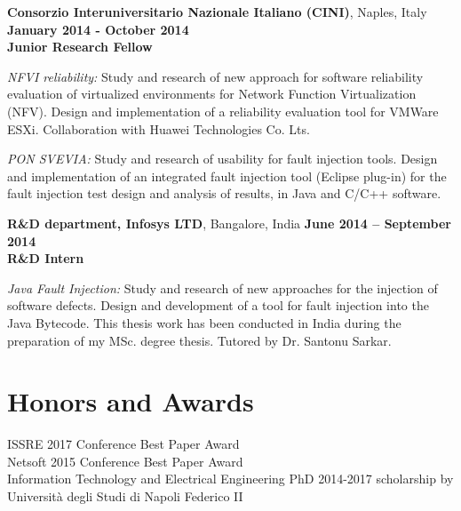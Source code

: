 \documentclass[margin,line]{resume}
\begin{document}
\begin{resume}
\textbf{Consorzio Interuniversitario Nazionale Italiano (CINI)}, Naples, Italy\\
\null\hfill\textbf{January 2014 - October 2014}\\
\textbf{Junior Research Fellow}\hfill 
\vspace{-3mm}\\\vspace{-1mm}
\begin{list2}
	\item \filbreak\textit{NFVI reliability:} Study and research of new approach for software reliability evaluation of virtualized environments for Network Function Virtualization (NFV). Design and implementation of a reliability evaluation tool for VMWare ESXi. Collaboration with Huawei Technologies Co. Lts.
	\item \filbreak\textit{PON SVEVIA:} Study and research of usability for fault injection tools. Design and implementation of an integrated fault injection tool (Eclipse plug-in) for the fault injection test design and analysis of results, in Java and C/C++ software.
\end{list2}


\filbreak
\textbf{R\&D department, Infosys LTD}, Bangalore, India\hfill
\textbf{June 2014 -- September 2014}\\
\textbf{R\&D Intern}\hfill 
\vspace{-3mm}\\\vspace{-1mm}
\begin{list2}
    \item \filbreak\textit{Java Fault Injection:} Study and research of new approaches for the injection of software defects. Design and development of a tool for fault injection into the Java Bytecode. This thesis work has been conducted in India during the preparation of my MSc. degree thesis. Tutored by Dr. Santonu Sarkar.
\end{list2}

\section{\mysidestyle Honors and Awards}
ISSRE 2017 Conference Best Paper Award
\vspace{1mm}\\%
Netsoft 2015 Conference Best Paper Award
\vspace{1mm}\\%
Information Technology and Electrical Engineering PhD 2014-2017 scholarship by Universit\`a degli Studi di Napoli Federico II


\end{resume}
\end{document}
